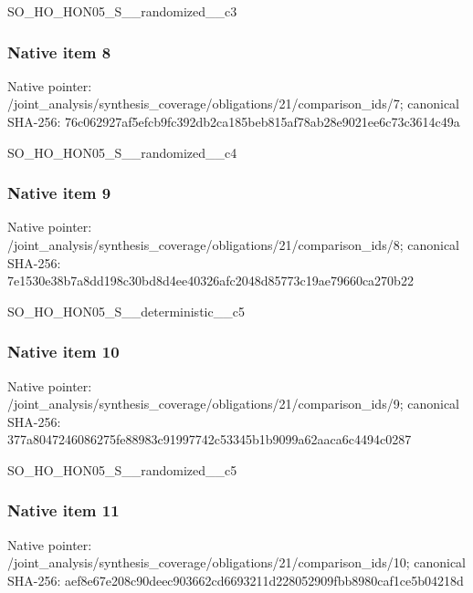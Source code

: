 \documentclass[10pt,a4paper]{article}
\begin{document}
\begingroup\raggedright\sloppy SO\_\allowbreak{}HO\_\allowbreak{}HON05\_\allowbreak{}S\_\allowbreak{}\_\allowbreak{}randomized\_\allowbreak{}\_\allowbreak{}c3\par\endgroup

\subsubsection{Native item 8}
Native pointer: /joint\_\allowbreak{}analysis/synthesis\_\allowbreak{}coverage/obligations/21/comparison\_\allowbreak{}ids/7; canonical SHA-256: 76c062927af5efcb9fc392db2ca185beb815af78ab28e9021ee6c73c3614c49a

\begingroup\raggedright\sloppy SO\_\allowbreak{}HO\_\allowbreak{}HON05\_\allowbreak{}S\_\allowbreak{}\_\allowbreak{}randomized\_\allowbreak{}\_\allowbreak{}c4\par\endgroup

\subsubsection{Native item 9}
Native pointer: /joint\_\allowbreak{}analysis/synthesis\_\allowbreak{}coverage/obligations/21/comparison\_\allowbreak{}ids/8; canonical SHA-256: 7e1530e38b7a8dd198c30bd8d4ee40326afc2048d85773c19ae79660ca270b22

\begingroup\raggedright\sloppy SO\_\allowbreak{}HO\_\allowbreak{}HON05\_\allowbreak{}S\_\allowbreak{}\_\allowbreak{}deterministic\_\allowbreak{}\_\allowbreak{}c5\par\endgroup

\subsubsection{Native item 10}
Native pointer: /joint\_\allowbreak{}analysis/synthesis\_\allowbreak{}coverage/obligations/21/comparison\_\allowbreak{}ids/9; canonical SHA-256: 377a8047246086275fe88983c91997742c53345b1b9099a62aaca6c4494c0287

\begingroup\raggedright\sloppy SO\_\allowbreak{}HO\_\allowbreak{}HON05\_\allowbreak{}S\_\allowbreak{}\_\allowbreak{}randomized\_\allowbreak{}\_\allowbreak{}c5\par\endgroup

\subsubsection{Native item 11}
Native pointer: /joint\_\allowbreak{}analysis/synthesis\_\allowbreak{}coverage/obligations/21/comparison\_\allowbreak{}ids/10; canonical SHA-256: aef8e67e208c90deec903662cd6693211d228052909fbb8980caf1ce5b04218d
\end{document}
